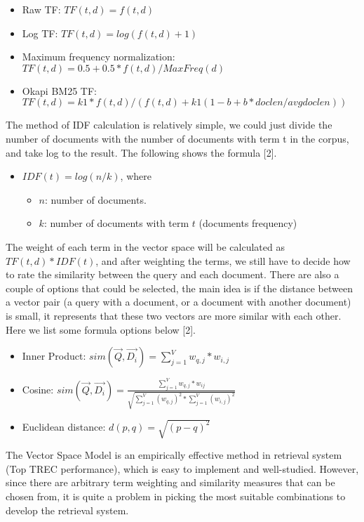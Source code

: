 \documentclass{article}
\begin{document}
\begin{itemize}
    \item Raw TF: $TF(t,d) = f(t,d)$
    \item Log TF: $TF(t,d)=log (f(t,d) + 1)$
    \item Maximum frequency normalization: $TF(t,d) = 0.5 + 0.5 * f(t,d) / MaxFreq(d)$
    \item Okapi BM25 TF: $TF(t,d) = k1 * f(t,d) / (f(t,d) + k1(1 - b + b*doclen / avgdoclen))$
\end{itemize}

The method of IDF calculation is relatively simple, we could just divide the number of documents with the number of documents with term t in the corpus, and take log to the result. The following shows the formula [2].

\begin{itemize}
    \item $IDF(t) = log(n/k)$, where
    \begin{itemize}
        \item $n$: number of documents.
        \item $k$: number of documents with term $t$ (documents frequency)
    \end{itemize}
\end{itemize}

The weight of each term in the vector space will be calculated as $TF(t,d) * IDF(t)$, and after weighting the terms, we still have to decide how to rate the similarity between the query and each document. There are also a couple of options that could be selected, the main idea is if the distance between a vector pair (a query with a document, or a document with another document) is small, it represents that these two vectors are more similar with each other. Here we list some formula options below [2].

\begin{itemize}
    \item Inner Product: $sim(\overrightarrow{Q}, \overrightarrow{D_i}) = \sum_{j=1}^{V} w_{q,j} * w_{i,j}$
    \item Cosine: $sim(\overrightarrow{Q}, \overrightarrow{D_i}) = \frac{\sum_{j=1}^{V} w_{q,j} * w_{ij}}{\sqrt{\sum_{j=1}^{V} (w_{q,j})^{2} * \sum_{j=1}^{V} (w_{i,j})^{2}}}$
    \item Euclidean distance: $d(p,q) = \sqrt{(p-q)^{2}}$
\end{itemize}

The Vector Space Model is an empirically effective method in retrieval system (Top TREC performance), which is easy to implement and well-studied. However, since there are arbitrary term weighting and similarity measures that can be chosen from, it is quite a problem in picking the most suitable combinations to develop the retrieval system.
\end{document}
